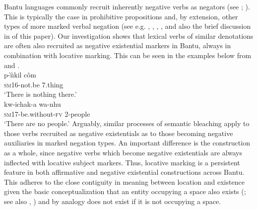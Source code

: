 \documentclass[output=paper]{langsci/langscibook}
\begin{document}
Bantu languages commonly recruit inherently negative verbs as negators (see \citealt{Givon1973}; \citeyear[382--383]{Givon2001}). This is typically the case in prohibitive propositions and, by extension, other types of more marked verbal negation (see e.g. \citealt{Bernander2018}, \citealt{DevosOlmen2013}, 
\citealt{Guldemann1999}, \citealt[191--193]{Nurse2008}, and also the brief discussion in  of this paper). Our investigation shows that lexical verbs of similar denotations are often also recruited as negative existential markers in Bantu, always in combination with locative marking. This can be seen in the examples below from  and .
\ea\label{ex:ruwund-nothing}
\\
\gll p-{\`\i}{\`\i}kil c{\^o}m\\
	\textsc{sm}16-not.be 7.thing \\
\glt `There is nothing there.'
\z
\ea\label{ex:kagulu-people}
\\
\gll kw-ichak-a wa-nhu\\
	\textsc{sm}17-be.without-\textsc{fv} 2-people\\
\glt `There are no people.'
\z
Arguably, similar processes of semantic bleaching apply to those verbs
recruited as negative existentials as to those becoming negative
auxiliaries in marked negation types. An important difference is the
construction as a whole, since negative verbs which become negative existentials are always inflected with locative subject markers. Thus, locative marking is a persistent feature in both affirmative and negative existential constructions across Bantu. This adheres to the close contiguity in meaning between location and existence given the basic conceptualization that an entity occupying a space also exists (\citealt[407]{Lakoff1987}; see also \citealt{Gaeta2013}, \citealt{Koch2012}) and by analogy does not exist if it is not occupying a space.
\end{document}
